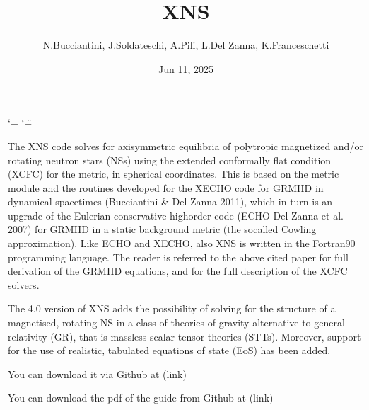 \documentclass[letterpaper,10pt,english]{sphinxmanual}
\title{XNS}
\date{Jun 11, 2025}
\author{N.Bucciantini, J.Soldateschi, A.Pili, L.Del Zanna, K.Franceschetti}
\begin{document}
\ifdefined\shorthandoff
  \ifnum\catcode`\=\string=\active\shorthandoff{=}\fi
  \ifnum\catcode`\"=\active{}\fi
\fi

\pagestyle{empty}
\sphinxmaketitle
\pagestyle{plain}
\sphinxtableofcontents
\pagestyle{normal}
\label{\detokenize{index::doc}}
\sphinxstepscope



\sphinxAtStartPar
The XNS code solves for axisymmetric equilibria of polytropic magnetized and/or rotating neutron stars (NSs) using the extended conformally flat condition (XCFC) for the metric, in spherical coordinates. This is based on the metric module and the routines developed for the X\sphinxhyphen{}ECHO code for GRMHD in dynamical spacetimes (Bucciantini \& Del Zanna 2011), which in turn is an upgrade of the Eulerian conservative high\sphinxhyphen{}order code (ECHO Del Zanna et al. 2007) for GRMHD in a static background metric (the so\sphinxhyphen{}called Cowling approximation). Like ECHO and X\sphinxhyphen{}ECHO, also XNS is written in the Fortran90 programming language. The reader is referred to the above cited paper for full derivation of the GRMHD equations, and for the full description of the XCFC solvers.

\sphinxAtStartPar
The 4.0 version of XNS adds the possibility of solving for the structure of a magnetised, rotating NS in a class of theories of gravity alternative to general relativity (GR), that is massless scalar tensor theories (STTs). Moreover, support for the use of realistic, tabulated equations of state (EoS) has been added.

\sphinxAtStartPar
You can download it via Github at (link)

\sphinxAtStartPar
You can download the pdf of the guide from Github at (link)
\end{document}
